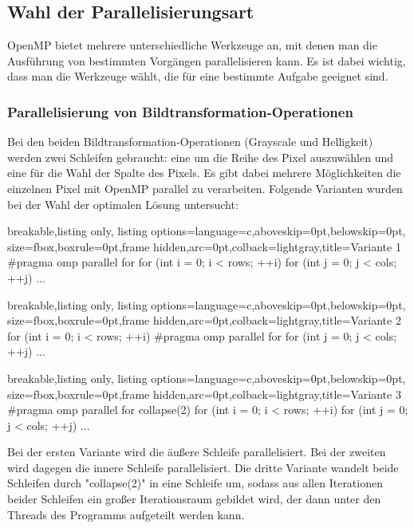 \documentclass[11pt]{amsart}
\begin{document}
\subsection{Wahl der Parallelisierungsart} \label{wahlParallel}
OpenMP bietet mehrere unterschiedliche Werkzeuge an, mit denen man die Ausführung von bestimmten Vorgängen parallelisieren kann. Es ist dabei wichtig, dass man die Werkzeuge wählt, die für eine bestimmte Aufgabe geeignet sind.

\subsubsection{Parallelisierung von Bildtransformation-Operationen}
Bei den beiden Bildtransformation-Operationen (Grayscale und Helligkeit) werden zwei Schleifen gebraucht: eine um die Reihe des Pixel auszuwählen und eine für die Wahl der Spalte des Pixels. Es gibt dabei mehrere Möglichkeiten die einzelnen Pixel mit OpenMP parallel zu verarbeiten. Folgende Varianten wurden bei der Wahl der optimalen Lösung untersucht:
 

  
  \begin{tcblisting}{breakable,listing only,
  listing options={language=c,aboveskip=0pt,belowskip=0pt},
  size=fbox,boxrule=0pt,frame hidden,arc=0pt,colback=lightgray,title=Variante 1}
#pragma omp parallel for
for (int i = 0; i < rows; ++i) {
    for (int j = 0; j < cols; ++j) {
        ...
    }
}
\end{tcblisting}



  \begin{tcblisting}{breakable,listing only,
  listing options={language=c,aboveskip=0pt,belowskip=0pt},
  size=fbox,boxrule=0pt,frame hidden,arc=0pt,colback=lightgray,title=Variante 2}
for (int i = 0; i < rows; ++i) {
#pragma omp parallel for
    for (int j = 0; j < cols; ++j) {
        ...
    }
}
\end{tcblisting}

  \begin{tcblisting}{breakable,listing only,
  listing options={language=c,aboveskip=0pt,belowskip=0pt},
  size=fbox,boxrule=0pt,frame hidden,arc=0pt,colback=lightgray,title=Variante 3}
#pragma omp parallel for collapse(2)
for (int i = 0; i < rows; ++i) {
    for (int j = 0; j < cols; ++j) {
        ...
    }
}
\end{tcblisting}

Bei der ersten Variante wird die äußere Schleife parallelisiert. Bei der zweiten wird dagegen die innere Schleife parallelisiert. Die dritte Variante wandelt beide Schleifen durch "collapse(2)" in eine Schleife um, sodass aus allen Iterationen beider Schleifen ein großer Iterationsraum gebildet wird, der dann unter den Threads des Programms aufgeteilt werden kann.
\end{document}
